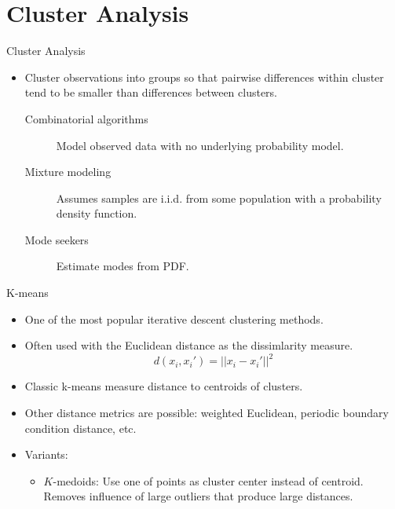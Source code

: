 \documentclass[aspectratio=169]{beamer}
\begin{document}
\section{Cluster Analysis}

\begin{frame}{Cluster Analysis}
    \begin{itemize}
        \item Cluster observations into groups so that pairwise differences within cluster tend to be smaller than differences between clusters.
        \begin{description}
        \item[Combinatorial algorithms] Model observed data with no underlying probability model.
        \item[Mixture modeling] Assumes samples are i.i.d. from some population with a probability density function.
        \item[Mode seekers] Estimate modes from PDF.
        \end{description}
    \end{itemize}
\end{frame}

\begin{frame}{K-means}
    \begin{itemize}
        \item One of the most popular iterative descent clustering methods.
        \item Often used with the Euclidean distance as the dissimlarity measure.
        \begin{equation*}
            d(x_i, x_i') = ||x_i - x_i'||^2
        \end{equation*}
        \item Classic k-means measure distance to centroids of clusters.
        \item Other distance metrics are possible: weighted Euclidean, periodic boundary condition distance, etc.
        \item Variants:
        \begin{itemize}
            \item $K$-medoids: Use one of points as cluster center instead of centroid. Removes influence of large outliers that produce large distances.
        \end{itemize}
    \end{itemize}
\end{frame}
\end{document}
